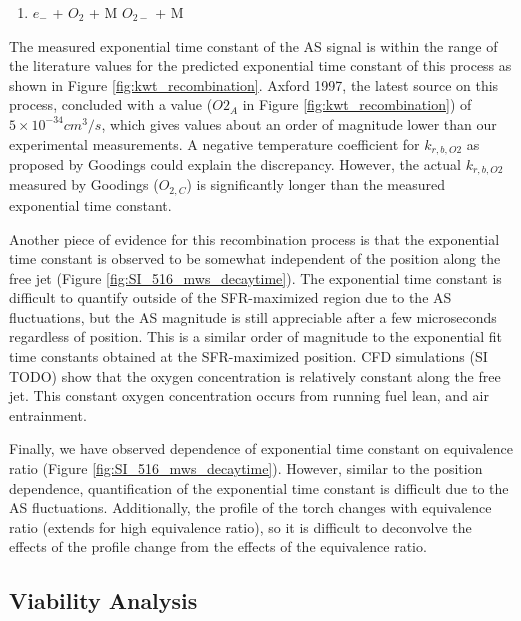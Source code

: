 \begin{enumerate}
\item $e_-$ + $O_2$ + M \rightarrow $O_{2-}$ + M 
\end{enumerate}  

The measured exponential time constant of the AS signal is within the range of the literature values for the predicted exponential time constant of this process as shown in Figure \ref{fig:kwt_recombination}. Axford 1997, the latest source on this process, concluded with a value ($O2_A$ in Figure \ref{fig:kwt_recombination}) of $5 \times 10^{-34} cm^3/s$, which gives values about an order of magnitude lower than our experimental measurements. A negative temperature coefficient for $k_{r,b,O2}$ as proposed by Goodings could explain the discrepancy. However, the actual $k_{r,b,O2}$ measured by Goodings ($O_{2,C}$) is significantly longer than the measured exponential time constant. 

Another piece of evidence for this recombination process is that the exponential time constant is observed to be somewhat independent of the position along the free jet (Figure \ref*{fig:SI_516_mws_decaytime}). The exponential time constant is difficult to quantify outside of the SFR-maximized region due to the AS fluctuations, but the AS magnitude is still appreciable after a few microseconds regardless of position. This is a similar order of magnitude to the exponential fit time constants obtained at the SFR-maximized position. CFD simulations (SI TODO) show that the oxygen concentration is relatively constant along the free jet. This constant oxygen concentration occurs from running fuel lean, and air entrainment.

Finally, we have observed dependence of exponential time constant on equivalence ratio (Figure \ref*{fig:SI_516_mws_decaytime}). However, similar to the position dependence, quantification of the exponential time constant is difficult due to the AS fluctuations. Additionally, the profile of the torch changes with equivalence ratio (extends for high equivalence ratio), so it is difficult to deconvolve the effects of the profile change from the effects of the equivalence ratio.



\subsection{Viability Analysis}

